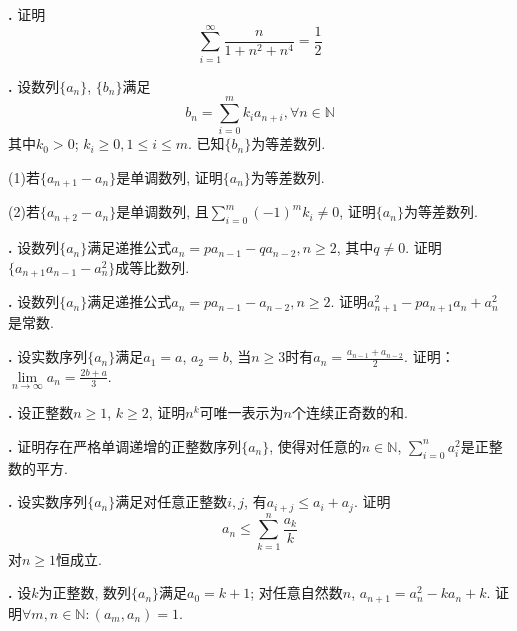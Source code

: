 \par \textbf{\theprobseq .} \cite{SMI} 证明
\begin{equation}
    \sum_{i=1}^\infty \frac{n}{1+n^2+n^4}=\frac{1}{2}
\end{equation}

\par \textbf{\theprobseq .} 设数列$\{a_n\}$, $\{b_n\}$满足
\begin{equation}
    b_n=\sum_{i=0}^m k_i a_{n+i}, \forall n\in \mathbb{N}
\end{equation}
其中$k_0>0$; $k_i\ge 0, 1\le i\le m$. 已知$\{b_n\}$为等差数列. 
\par (1)若$\{a_{n+1}-a_{n}\}$是单调数列, 证明$\{a_n\}$为等差数列. 
\par (2)若$\{a_{n+2}-a_{n}\}$是单调数列, 且$\sum_{i=0}^m (-1)^m k_i \neq 0$, 证明$\{a_n\}$为等差数列. 

\par \textbf{\theprobseq .} 设数列$\{a_n\}$满足递推公式$a_n=pa_{n-1}-qa_{n-2}, n\ge 2$, 其中$q\neq 0$. 证明$\{a_{n+1}a_{n-1}-a_n^2\}$成等比数列. 

\par \textbf{\theprobseq .} 设数列$\{a_n\}$满足递推公式$a_n=pa_{n-1}-a_{n-2}, n\ge 2$. 证明$a_{n+1}^2-pa_{n+1}a_n+a_n^2$是常数. 


\par \textbf{\theprobseq .} 设实数序列$\{a_n\}$满足$a_1=a$, $a_2=b$, 当$n\ge 3$时有$a_n=\frac{a_{n-1}+a_{n-2}}{2}$. 证明：$\lim\limits_{n\to\infty} a_n=\frac{2b+a}{3}$. 


\par \textbf{\theprobseq .} \cite{SMI} 设正整数$n\ge 1$, $k\ge 2$, 证明$n^k$可唯一表示为$n$个连续正奇数的和. 

\par \textbf{\theprobseq .} \cite{SMI} 证明存在严格单调递增的正整数序列$\{a_n\}$, 使得对任意的$n\in \mathbb{N}$, $\sum_{i=0}^n a_i^2$是正整数的平方. 

\par \textbf{\theprobseq .} \cite{SMI} 设实数序列$\{a_n\}$满足对任意正整数$i,j$, 有$a_{i+j}\le a_i+a_j$. 证明
\begin{equation}
    a_n \le \sum_{k=1}^n \frac{a_k}{k}
\end{equation}
对$n\ge 1$恒成立. 

\par \textbf{\theprobseq .} \cite{SMI} 设$k$为正整数, 数列$\{a_n\}$满足$a_0=k+1$; 对任意自然数$n$, $a_{n+1}=a_n^2-ka_n+k$. 证明$\forall m,n\in \mathbb{N}: (a_m, a_n)=1$. 

